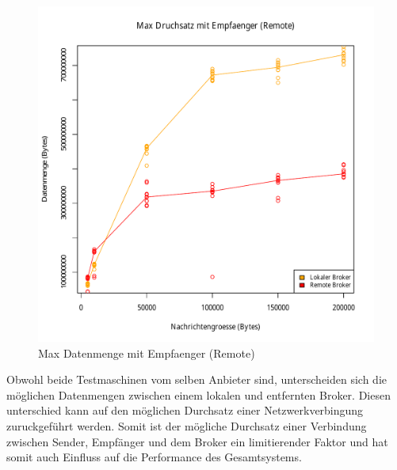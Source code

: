 \begin{figure}
\center
 \includegraphics[width=1\textwidth]{images/measurement/rate-limit-unlimited-AvsB.pdf}
  \caption{Max Datenmenge mit Empfaenger (Remote)}
  \label{img:maxByteThroughputB}
\end{figure}
Obwohl beide Testmaschinen vom selben Anbieter sind, unterscheiden sich die möglichen Datenmengen zwischen einem lokalen und entfernten Broker. Diesen unterschied kann auf den möglichen Durchsatz einer Netzwerkverbingung zuruckgeführt werden. Somit ist der mögliche Durchsatz einer Verbindung zwischen Sender, Empfänger und dem Broker ein limitierender Faktor und hat somit auch Einfluss auf die Performance des Gesamtsystems.

